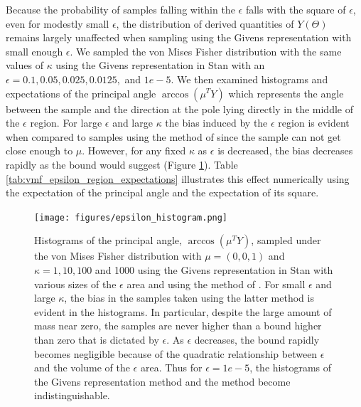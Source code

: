 \documentclass[ba]{imsart}
\numberwithin{equation}{section}
\theoremstyle{plain}
\begin{document}
\noindent Because the probability of samples falling within the $\epsilon$ falls with the square of $\epsilon$, even for modestly small $\epsilon$, the distribution of derived quantities of $Y(\Theta)$ remains largely unaffected when sampling using the Givens representation with small enough $\epsilon$. We sampled the von Mises Fisher distribution with the same values of $\kappa$ using the Givens representation in Stan with an $\epsilon = 0.1, 0.05, 0.025, 0.0125,$ and $1e-5$. We then examined histograms and expectations of the principal angle $\arccos (\mu^T Y)$ which represents the angle between the sample and the direction at the pole lying directly in the middle of the $\epsilon$ region. For large $\epsilon$ and large $\kappa$ the bias induced by the $\epsilon$ region is evident when compared to samples using the method of \citet{wood1994simulation} since the sample can not get close enough to $\mu$. However, for any fixed $\kappa$ as $\epsilon$ is decreased, the bias decreases rapidly as the bound would suggest (Figure \ref{fig:epsilon_histogram}). Table \ref{tab:vmf_epsilon_region_expectations} illustrates this effect numerically using the expectation of the principal angle and the expectation of its square.

\begin{figure}[h]
\centering
\vspace{.1in}
\texttt{[image: figures/epsilon\_histogram.png]}
\vspace{.05in}
\caption{Histograms of the principal angle, $\arccos (\mu^T Y)$, sampled under the von Mises Fisher distribution with $\mu = (0,0,1)$ and $\kappa = 1, 10, 100$ and 1000 using the Givens representation in Stan with various sizes of the $\epsilon$ area and using the method of \citet{wood1994simulation}. For small $\epsilon$ and large $\kappa$, the bias in the samples taken using the latter method is evident in the histograms. In particular, despite the large amount of mass near zero, the samples are never higher than a bound higher than zero that is dictated by $\epsilon$. As $\epsilon$ decreases, the bound rapidly becomes negligible because of the quadratic relationship between $\epsilon$ and the volume of the $\epsilon$ area. Thus for $\epsilon = 1e-5$, the histograms of the Givens representation method and the \citet{wood1994simulation} method become indistinguishable.}
\label{fig:epsilon_histogram}
\end{figure}
\end{document}
